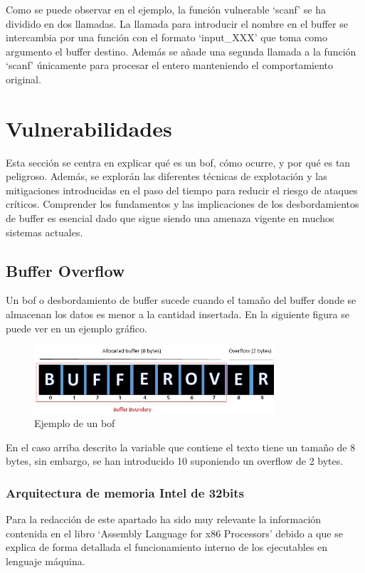 Como se puede observar en el ejemplo, la función vulnerable `scanf' se ha dividido en dos llamadas.
La llamada para introducir el nombre en el buffer se intercambia por una función con el formato `input\_XXX' que toma como argumento el buffer destino.
Además se añade una segunda llamada a la función `scanf' únicamente para procesar el entero manteniendo el comportamiento original.

\section{Vulnerabilidades}
Esta sección se centra en explicar qué es un \acrfull{bof}, cómo ocurre, y por qué es tan peligroso.
Además, se explorán las diferentes técnicas de explotación y las mitigaciones introducidas en el paso del tiempo para reducir el riesgo de ataques críticos.
Comprender los fundamentos y las implicaciones de los desbordamientos de buffer es esencial dado que sigue siendo una amenaza vigente en muchos sistemas actuales.
\subsection{Buffer Overflow}
Un \acrfull{bof} o desbordamiento de buffer sucede cuando el tamaño del buffer donde se almacenan los datos es menor a la cantidad insertada.
En la siguiente figura se puede ver en un ejemplo gráfico.
\begin{figure}[htb!]
    \centering                        
    \includegraphics[width=0.8\textwidth]{images/BOF-Example.jpg}
    \caption{Ejemplo de un \acrlong{bof} }
    \label{fig:bofexample}
\end{figure}
\FloatBarrier
En el caso arriba descrito la variable que contiene el texto tiene un tamaño de 8 bytes, sin embargo, se han introducido 10 suponiendo un overflow de 2 bytes.

\subsubsection{Arquitectura de memoria Intel de 32bits}
Para la redacción de este apartado ha sido muy relevante la información contenida en el libro `Assembly Language for x86 Processors' \cite{x86asm} debido a que se explica de forma detallada el funcionamiento interno de los ejecutables en lenguaje máquina.

